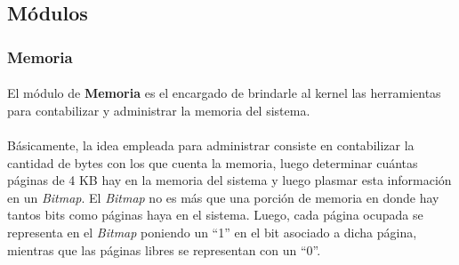 \documentclass[11pt, a4paper]{article}
\begin{document}
	\subsection{Módulos}
	\label{modulos}
		\subsubsection{Memoria}
			\paragraph{}
			El módulo de \textbf{Memoria} es el encargado de brindarle al kernel las herramientas para contabilizar y administrar la memoria del sistema.
			
			\paragraph{}
			Básicamente, la idea empleada para administrar consiste en contabilizar la cantidad de bytes con los que cuenta la memoria, luego determinar cuántas páginas de 4 KB hay en la memoria del sistema y luego plasmar esta información en un \textit{Bitmap}. El \textit{Bitmap} no es más que una porción de memoria en donde hay tantos bits como páginas haya en el sistema. Luego, cada página ocupada se representa en el \textit{Bitmap} poniendo un ``1'' en el bit asociado a dicha página, mientras que las páginas libres se representan con un ``0''.
			
\end{document}
